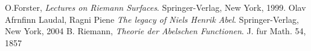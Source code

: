 \documentclass[11pt]{amsart}
\theoremstyle{definition}
\begin{document}
\vspace{4ex}



\begin{thebibliography}{30}
O.Forster, \emph{Lectures on Riemann Surfaces}. Springer-Verlag, New York, 1999.
Olav Afrnfinn Laudal, Ragni Piene \emph{The legacy of Niels Henrik Abel}. Springer-Verlag, New York, 2004
B. Riemann, \emph{Theorie der Abelschen Functionen}. J. f$\ddot{u}$r Math. 54, 1857
\end{thebibliography}
\end{document}
